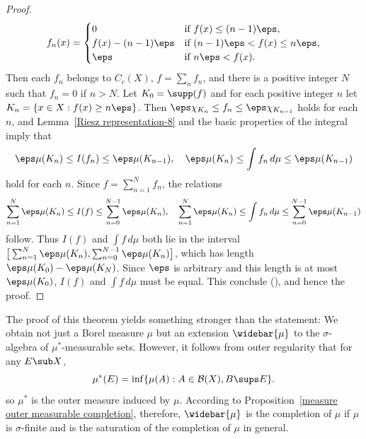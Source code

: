 \begin{proof}
\begin{equation*}
\begin{aligned}
f_n(x)=\begin{cases}
0&\text{if $f(x)\leq(n-1)\eps$},\\
f(x)-(n-1)\eps&\text{if $(n-1)\eps<f(x)\leq n\eps$},\\
\eps&\text{if $n\eps<f(x)$}.
\end{cases}
\end{aligned}
\end{equation*}
Then each $f_n$ belongs to $C_c(X)$, $f=\sum_nf_n$, and there is a positive integer $N$ such that $f_n=0$ if $n>N$. Let $K_0=\supp(f)$ and for each positive integer $n$ let $K_n=\{x\in X:f(x)\geq n\eps\}$. Then $\eps\chi_{K_n}\leq f_n\leq\eps\chi_{K_{n-1}}$ holds for each $n$, and Lemma~\ref{Riesz representation-8} and the basic properties of the integral imply that 
\[\eps\mu(K_n)\leq I(f_n)\leq\eps\mu(K_{n-1}),\quad \eps\mu(K_n)\leq\int f_n\,d\mu\leq\eps\mu(K_{n-1})\]
hold for each $n$. Since $f=\sum_{n=1}^{N}f_n$, the relations
\[\sum_{n=1}^{N}\eps\mu(K_n)\leq I(f)\leq\sum_{n=0}^{N-1}\eps\mu(K_{n}),\quad \sum_{n=1}^{N}\eps\mu(K_n)\leq\int f_n\,d\mu\leq\sum_{n=0}^{N-1}\eps\mu(K_{n-1})\]
follow. Thus $I(f)$ and $\int f\,d\mu$ both lie in the interval $\big[\sum_{n=1}^{N}\eps\mu(K_n),\sum_{n=0}^{N-1}\eps\mu(K_n)\big]$, which has length $\eps\mu(K_0)-\eps\mu(K_N)$. Since $\eps$ is arbitrary and this length is at most $\eps\mu(K_0)$, $I(f)$ and $\int f\,d\mu$ must be equal. This conclude (), and hence the proof.
\end{proof}
The proof of this theorem yields something stronger than the statement: We obtain not just a Borel measure $\mu$ but an extension $\widebar{\mu}$ to the $\sigma$-algebra of $\mu^*$-measurable sets. However, it follows from outer regularity that for any $E\sub X$,
\[\mu^*(E)=\inf\{\mu(A):A\in\mathcal{B}(X),B\sups E\}.\]
so $\mu^*$ is the outer measure induced by $\mu$. According to Proposition~\ref{measure outer measurable completion}, therefore, $\widebar{\mu}$ is the completion of $\mu$ if $\mu$ is $\sigma$-finite and is the saturation of the completion of $\mu$ in general.
